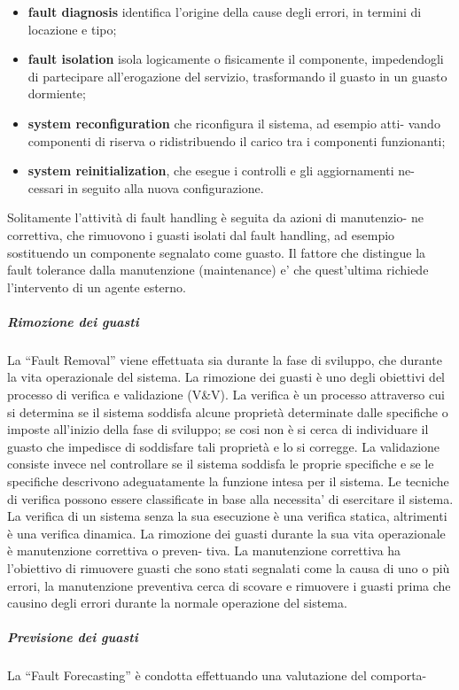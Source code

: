 \documentclass[14pt]{extarticle}
\begin{document}
\begin{itemize}
\item \textbf{fault diagnosis} identifica l’origine della cause degli errori, in termini di
locazione e tipo;
\item \textbf{fault isolation} isola logicamente o fisicamente il componente, impedendogli di partecipare all’erogazione del servizio, trasformando il guasto in
un guasto dormiente;
\item \textbf{system reconfiguration} che riconfigura il sistema, ad esempio atti-
vando componenti di riserva o ridistribuendo il carico tra i componenti
funzionanti;
\item \textbf{system reinitialization}, che esegue i controlli e gli aggiornamenti ne-
cessari in seguito alla nuova configurazione.

\end{itemize}
Solitamente l’attività di fault handling è seguita da azioni di manutenzio-
ne correttiva, che rimuovono i guasti isolati dal fault handling, ad esempio
sostituendo un componente segnalato come guasto. Il fattore che distingue la
fault tolerance dalla manutenzione (maintenance) e’ che quest’ultima richiede
l’intervento di un agente esterno.
\subparagraph{Rimozione dei guasti}
La “Fault Removal” viene effettuata sia durante la fase di sviluppo, che durante la vita operazionale del sistema.
La rimozione dei guasti è uno degli obiettivi del processo di verifica e validazione (V\&V).
La verifica è un processo attraverso cui si determina se il sistema soddisfa alcune proprietà determinate dalle
specifiche o imposte all’inizio della fase di sviluppo; se cosi non è si cerca di
individuare il guasto che impedisce di soddisfare tali proprietà e lo si corregge.
La validazione consiste invece nel controllare se il sistema soddisfa le proprie
specifiche e se le specifiche descrivono adeguatamente la funzione intesa per il
sistema. Le tecniche di verifica possono essere classificate in base alla necessita’ di esercitare il sistema. La verifica di un sistema senza la sua esecuzione
è una verifica statica, altrimenti è una verifica dinamica. La rimozione dei
guasti durante la sua vita operazionale è manutenzione correttiva o preven-
tiva. La manutenzione correttiva ha l’obiettivo di rimuovere guasti che sono
stati segnalati come la causa di uno o più errori, la manutenzione preventiva
cerca di scovare e rimuovere i guasti prima che causino degli errori durante la
normale operazione del sistema.
\subparagraph{Previsione dei guasti}
La “Fault Forecasting” è condotta effettuando una valutazione del comporta-
\end{document}
